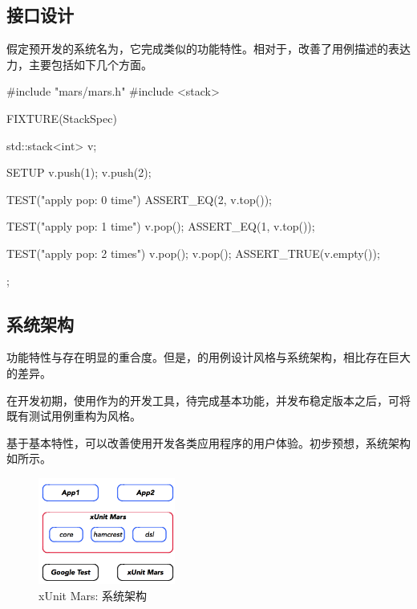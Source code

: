 \begin{content}

\subsection{接口设计}

假定预开发的系统名为，它完成类似的功能特性。相对于，改善了用例描述的表达力，主要包括如下几个方面。

\begin{enum}
\end{enum}

\begin{leftbar}
 \begin{c++}
#include "mars/mars.h"
#include <stack>

FIXTURE(StackSpec) {
  std::stack<int> v;   

  SETUP {
    v.push(1);
    v.push(2);
  }

  TEST("apply pop: 0 time") {
    ASSERT_EQ(2, v.top());
  }

  TEST("apply pop: 1 time") {
    v.pop();
    ASSERT_EQ(1, v.top());
  }

  TEST("apply pop: 2 times") {
    v.pop();
    v.pop();
    ASSERT_TRUE(v.empty());
  }
}; 
 \end{c++}
\end{leftbar}

\subsection{系统架构}

功能特性与存在明显的重合度。但是，的用例设计风格与系统架构，相比存在巨大的差异。

在开发初期，使用作为的开发工具，待完成基本功能，并发布稳定版本之后，可将既有测试用例重构为风格。

基于基本特性，可以改善使用开发各类应用程序的用户体验。初步预想，系统架构如所示。

\begin{figure}[H]
\centering
\includegraphics[width=0.4\textwidth]{figures/xunit/framework.png}
\caption{xUnit Mars: 系统架构}
 \label{fig:mars-framework}
\end{figure}

\end{content}

